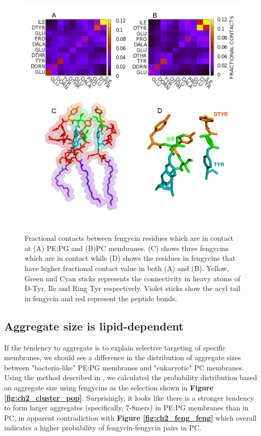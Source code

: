 \begin{figure}
\centering
\includegraphics[width=1.0\textwidth]{chapter2_figs/paper_amino_svg.png}
\caption{\label{fig:ch2_amino_contacts}Fractional contacts between fengycin residues which are in contact at (A) PE:PG and (B)PC membranes.
(C) shows three fengycins which are in contact while (D) shows the residues in fengycins that have higher fractional contact value in both
(A) and (B). Yellow, Green and Cyan sticks represents the connectivity in heavy atoms of D-Tyr, Ile and Ring Tyr respectively. Violet
sticks show the acyl tail in fengycin and red represent the peptide bonds.}
\end{figure}

\subsection{Aggregate size is lipid-dependent}
\label{subsec:ch2_aggregate_size}

If the tendency to aggregate is to explain selective targeting of specific
membranes, we should see a difference in the distribution of aggregate sizes
between "bacteria-like" PE:PG membranes and "eukaryotic" PC membranes. Using the
\textbf{} method described in \textbf{},  we
calculated the probability distribution  based on aggregate size using fengycins
as the selection shown in \textbf{Figure \ref{fig:ch2_cluster_pop}}. Surprisingly, it looks like
there is a stronger tendency to form larger aggregates (specifically, 7-8mers)
in PE:PG membranes than in PC, in apparent contradiction with \textbf{Figure
\ref{fig:ch2_feng_feng}} which overall indicates a higher probability of
fengycin-fengycin pairs in PC.

